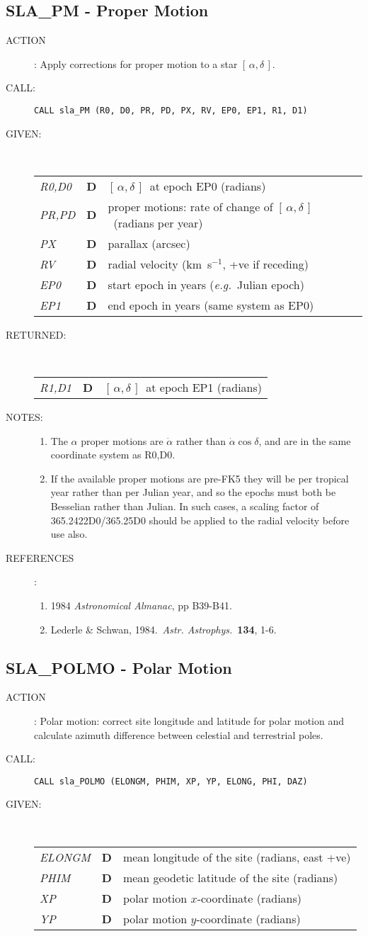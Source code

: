 \documentclass[11pt,twoside]{article}
\newcommand{\xlabel}[1]{}
\newcommand{\radec}     {$[\,\alpha,\delta\,]$}
\newcommand{\routine}[3]
{\hbadness=10000
  \vbox
  {
    \rule{\textwidth}{0.3mm}\\
    {\Large {\bf #1} \hfill #2 \hfill {\bf #1}}\\
    \setlength{\oldspacing}{\topsep}
    \setlength{\topsep}{0.3ex}
    \begin{description}
      #3
    \end{description}
    \setlength{\topsep}{\oldspacing}
  }
}
\renewcommand{\routine}[3]
   {
      \subsection{#1\xlabel{#1} - #2\label{#1}}
       \begin{description}
         #3
       \end{description}
   }
\newcommand{\action}[1]
{\item[ACTION]: #1}
\newcommand{\action}[1]
   {\item[ACTION:] #1}
\newcommand{\call}[1]
{\item[CALL]: \hspace{0.4em}{\tt #1}}
\newlength{\oldspacing}
\renewcommand{\call}[1]
   {
    \item[CALL:] {\tt #1}
   }
\newcommand{\args}[2]
{
  \goodbreak
  \setlength{\oldspacing}{\topsep}
  \setlength{\topsep}{0.3ex}
  \begin{description}
  \item[#1]:\\[1.5ex]
    \begin{tabular}{p{7em}p{6em}p{22em}}
      #2
    \end{tabular}
  \end{description}
  \setlength{\topsep}{\oldspacing}
}
\renewcommand{\args}[2]
   {
     \begin{description}
        \item[#1:]\\
        \begin{tabular}{p{7em}p{6em}l}
           #2
        \end{tabular}
     \end{description}
   }
\newcommand{\spec}[3]
{
  {\em {#1}} & {\bf \mbox{#2}} & {#3}
}
\newcommand{\notes}[1]
{
  \goodbreak
  \setlength{\oldspacing}{\topsep}
  \setlength{\topsep}{0.3ex}
  \begin{description}
    \item[NOTES]:
        #1
  \end{description}
  \setlength{\topsep}{\oldspacing}
}
\renewcommand{\notes}[1]
   {
      \begin{description}
         \item[NOTES:]
            #1
      \end{description}
   }
\newcommand{\refs}[1]
{
  \goodbreak
  \setlength{\oldspacing}{\topsep}
  \setlength{\topsep}{0.3ex}
  \begin{description}
    \item[REFERENCES]:
        #1
  \end{description}
  \setlength{\topsep}{\oldspacing}
}
\newcommand{\refs}[1]
   {
     \begin{description}
       \item[REFERENCES:]
           #1
     \end{description}
   }
\begin{document}
\routine{SLA\_PM}{Proper Motion}
{
 \action{Apply corrections for proper motion to a star \radec.}
 \call{CALL sla\_PM (R0, D0, PR, PD, PX, RV, EP0, EP1, R1, D1)}
}
\args{GIVEN}
{
 \spec{R0,D0}{D}{\radec\ at epoch EP0 (radians)} \\
 \spec{PR,PD}{D}{proper motions:  rate of change of
                 \radec\  (radians per year)} \\
 \spec{PX}{D}{parallax (arcsec)} \\
 \spec{RV}{D}{radial velocity (km~s$^{-1}$, +ve if receding)} \\
 \spec{EP0}{D}{start epoch in years ({\it e.g.}\ Julian epoch)} \\
 \spec{EP1}{D}{end epoch in years (same system as EP0)}
}
\args{RETURNED}
{
 \spec{R1,D1}{D}{\radec\ at epoch EP1 (radians)}
}
\notes
{
\begin{enumerate}
\item The $\alpha$ proper motions are $\dot{\alpha}$ rather than
      $\dot{\alpha}\cos\delta$, and are in the same coordinate
      system as R0,D0.
\item If the available proper motions are pre-FK5 they will be per
      tropical year rather than per Julian year, and so the epochs
      must both be Besselian rather than Julian.  In such cases, a
      scaling factor of 365.2422D0/365.25D0 should be applied to the
      radial velocity before use also.
\end{enumerate}
}
\refs
{
 \begin{enumerate}
  \item 1984 {\it Astronomical Almanac}, pp B39-B41.
  \item Lederle \& Schwan, 1984.\ {\it Astr. Astrophys.}\ {\bf 134}, 1-6.
 \end{enumerate}
}
\routine{SLA\_POLMO}{Polar Motion}
{
 \action{Polar motion:  correct site longitude and latitude for polar
         motion and calculate azimuth difference between celestial and
         terrestrial poles.}
 \call{CALL sla\_POLMO (ELONGM, PHIM, XP, YP, ELONG, PHI, DAZ)}
}
\args{GIVEN}
{
 \spec{ELONGM}{D}{mean longitude of the site (radians, east +ve)} \\
 \spec{PHIM}{D}{mean geodetic latitude of the site (radians)} \\
 \spec{XP}{D}{polar motion $x$-coordinate (radians)} \\
 \spec{YP}{D}{polar motion $y$-coordinate (radians)}
}
\end{document}
